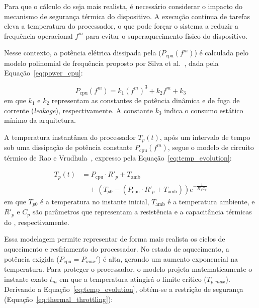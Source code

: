 Para que o cálculo do  seja mais realista, é necessário considerar o impacto do mecanismo de segurança térmica do dispositivo. A execução contínua de tarefas eleva a temperatura do processador, o que pode forçar o sistema a reduzir a frequência operacional $f^m$ para evitar o superaquecimento físico do dispositivo.

Nesse contexto, a potência elétrica dissipada pela  ($P_{\mathrm{cpu}}(f^m)$) é calculada pelo modelo polinomial de frequência proposto por Silva et al.~\cite{silva2022analytical}, dada pela Equação~\ref{eq:power_cpu}:

\begin{equation}
\label{eq:power_cpu}
P_{\mathrm{cpu}}(f^m) = k_1 (f^m)^3 + k_2 f^m + k_3
\end{equation}
em que $k_1$ e $k_2$ representam as constantes de potência dinâmica e de fuga de corrente (\textit{leakage}), respectivamente. A constante $k_3$ indica o consumo estático mínimo da arquitetura. 

A temperatura instantânea do processador $T_p(t)$, após um intervalo de tempo sob uma dissipação de potência constante $P_{\mathrm{cpu}}(f^m)$, segue o modelo de circuito térmico  de Rao e Vrudhula~\cite{rao2007performance}, expresso pela Equação~\ref{eq:temp_evolution}:

\begin{equation}
\label{eq:temp_evolution}
\begin{split}
T_p(t) &= P_{\mathrm{cpu}} \cdot R'_p + T_{\mathrm{amb}} \\
&\quad + (T_{p0} - (P_{\mathrm{cpu}} \cdot R'_p + T_{\mathrm{amb}})) e^{-\frac{t}{R'_p C_p}}
\end{split}
\end{equation}
em que $T_{p0}$ é a temperatura no instante inicial, $T_{\mathrm{amb}}$ é a temperatura ambiente, e $R'_p$ e $C_p$ são parâmetros que representam a resistência e a capacitância térmicas do , respectivamente.

Essa modelagem permite representar de forma mais realista os ciclos de aquecimento e resfriamento do processador. No estado de aquecimento, a potência exigida ($P_{\mathrm{cpu}} = P_{max}'$) é alta, gerando um aumento exponencial na temperatura. Para proteger o processador, o modelo projeta matematicamente o instante exato $t_m$ em que a temperatura atingirá o limite crítico ($T_{p,max}$). Derivando a Equação~\ref{eq:temp_evolution}, obtém-se a restrição de segurança (Equação~\ref{eq:thermal_throttling}):


